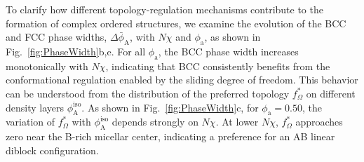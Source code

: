 To clarify how different topology-regulation mechanisms contribute to the formation of complex ordered structures, we examine the evolution of the BCC and FCC phase widths, $\Delta\bar{\phi}_{\mathrm A}$, with $N\chi$ and $\phi_{\mathrm a}$, as shown in Fig.~\ref{fig:PhaseWidth}b,e.
For all $\phi_{\mathrm a}$, the BCC phase width increases monotonically with $N\chi$, indicating that BCC consistently benefits from the conformational regulation enabled by the sliding degree of freedom.
This behavior can be understood from the distribution of the preferred topology $f_\Omega^\ast$ on different density layers $\phi_{\mathrm A}^{\mathrm{iso}}$.
As shown in Fig.~\ref{fig:PhaseWidth}c, for $\phi_{\mathrm a}=0.50$, the variation of $f_\Omega^\ast$ with $\phi_{\mathrm A}^{\mathrm{iso}}$ depends strongly on $N\chi$.
At lower $N\chi$, $f_\Omega^\ast$ approaches zero near the B-rich micellar center, indicating a preference for an AB linear diblock configuration.
